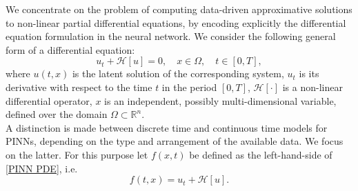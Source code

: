 We concentrate on the problem of computing data-driven approximative solutions to non-linear partial differential equations, by encoding explicitly the differential equation formulation in the neural network. We consider the following general form of a differential equation:
\begin{equation}
    \label{PINN PDE}
    u_t + \mathcal{H} \left[ u \right] = 0, \quad x \in \Omega, \quad t \in [0, T], 
\end{equation}
where $u(t,x)$ is the latent solution of the corresponding system, $u_t$ is its derivative with respect to the time $t$ in the period $\left[ 0, T \right]$, $\mathcal{H} \left[ \cdot \right]$ is a non-linear differential operator, $x$ is an independent, possibly multi-dimensional variable, defined over the domain $\Omega \subset \mathbb{R}^{n}$. \\
A distinction is made between discrete time and continuous time models for PINNs, depending on the type and arrangement of the available data. We focus on the latter. For this purpose let $f(x,t)$ be defined as the left-hand-side of \cref{PINN PDE}, i.e.
\begin{equation}
    \label{Residual Network}
    f(t,x) = u_t + \mathcal{H} \left[ u \right].
\end{equation}

